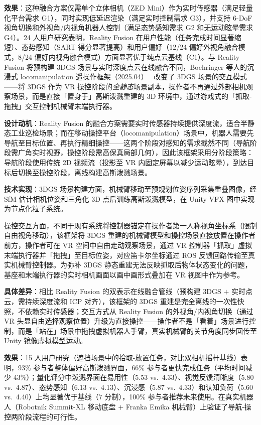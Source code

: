 \textbf{效果}：这种融合方案仅需单个立体相机（ZED Mini）作为实时传感器（满足轻量化平台需求 G1），同时实现低延迟渲染（满足实时控制需求 G3），并支持 6-DoF 视角切换和外视角/内视角机器人控制（满足态势感知需求 G2 和无运动眩晕需求 G4）。24 人用户研究表明，Reality Fusion 在用户性能（任务完成时间显著缩短）、态势感知（SART 得分显著提高）和用户偏好（12/24 偏好外视角融合模式，8/24 偏好内视角融合模式）方面显著优于纯点云基线（C1）。与 Reality Fusion 将预构建 3DGS 场景与实时深度点云在线融合不同，Boehringer 等人的沉浸式 locomanipulation 遥操作框架（2025.04）~\cite{2504_15229} 改变了 3DGS 场景的交互模式——将 3DGS 作为 VR 操控阶段的\emph{全静态}场景副本，操作者不再通过外部相机观察场景，而是直接「置身于」高斯泼溅重建的 3D 环境中，通过游戏式的「抓取-拖拽」交互控制机械臂末端执行器。

\textbf{设计动机}：Reality Fusion 的融合方案需要实时传感器持续提供深度流，适合半静态工业巡检场景；而在移动操控平台（locomanipulation）场景中，机器人需要先导航至目标位置、再执行精细操控——这两个阶段对感知的需求截然不同（导航阶段需广角实时视野，操控阶段需高保真局部几何），因此该框架采用分阶段策略：导航阶段使用传统 2D 视频流（投影至 VR 内固定屏幕以减少运动眩晕），到达目标后切换至操控阶段，离线构建高斯泼溅场景。

\textbf{技术实现}：3DGS 场景构建方面，机械臂移动至预规划位姿序列采集重叠图像，经 SfM 估计相机位姿和三角化 3D 点后训练高斯泼溅模型，在 Unity VFX 图中实现为节点化粒子系统。

操控交互方面，不同于现有系统将控制器锚定在操作者第一人称视角坐标系（限制自由视角移动），该框架将 3DGS 重建的机械臂模型和操控场景直接放置在操作者前方，操作者可在 VR 空间中自由走动观察场景，通过 VR 控制器「抓取」虚拟末端执行器并「拖拽」至目标位姿，对应笛卡尔坐标通过 ROS 反馈回路传输至真实机械臂控制器。为弥补 3DGS 静态重建无法反映抓取后物体状态变化的问题，基座和末端执行器的实时相机画面以画中画形式叠加在 VR 视图中作为参考。

\textbf{具体差异}：相比 Reality Fusion 的双表示在线融合管线（预构建 3DGS $+$ 实时点云，需持续深度流和 ICP 对齐），该框架的 3DGS 重建是完全离线的一次性快照，不依赖实时传感器；交互方式从 Reality Fusion 的外视角/内视角切换（通过 VR 头显自由选择观察位置）升级为直接操控——操作者不是「看着」场景进行控制，而是「站在」场景中拖拽虚拟机器人手臂，真实机械臂的关节角度同步回传至 Unity 镜像虚拟模型运动。

\textbf{效果}：15 人用户研究（遮挡场景中的拾取-放置任务，对比双相机摇杆基线）表明，93\% 参与者整体偏好高斯泼溅界面，66\% 参与者更快完成任务（平均时间减少 43\%）；量化评分中泼溅界面在易用性（5.53 vs.\ 4.33）、视觉反馈清晰度（5.80 vs.\ 4.87）、态势感知（6.13 vs.\ 4.13）、沉浸感（5.87 vs.\ 4.33）和认知负荷（5.60 vs.\ 4.40）上均显著优于基线（7 分制），100\% 参与者推荐未来使用。在真实机器人（Robotnik Summit-XL 移动底盘 $+$ Franka Emika 机械臂）上验证了导航-操控两阶段流程的可行性。

